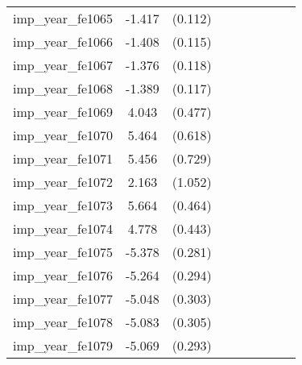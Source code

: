 {\begin{tabular}{l*{4}{cc}}
imp\_year\_fe1065&   -1.417\sym{***}&  (0.112)&                  &         &                  &         &                  &         \\
imp\_year\_fe1066&   -1.408\sym{***}&  (0.115)&                  &         &                  &         &                  &         \\
imp\_year\_fe1067&   -1.376\sym{***}&  (0.118)&                  &         &                  &         &                  &         \\
imp\_year\_fe1068&   -1.389\sym{***}&  (0.117)&                  &         &                  &         &                  &         \\
imp\_year\_fe1069&    4.043\sym{***}&  (0.477)&                  &         &                  &         &                  &         \\
imp\_year\_fe1070&    5.464\sym{***}&  (0.618)&                  &         &                  &         &                  &         \\
imp\_year\_fe1071&    5.456\sym{***}&  (0.729)&                  &         &                  &         &                  &         \\
imp\_year\_fe1072&    2.163\sym{*}  &  (1.052)&                  &         &                  &         &                  &         \\
imp\_year\_fe1073&    5.664\sym{***}&  (0.464)&                  &         &                  &         &                  &         \\
imp\_year\_fe1074&    4.778\sym{***}&  (0.443)&                  &         &                  &         &                  &         \\
imp\_year\_fe1075&   -5.378\sym{***}&  (0.281)&                  &         &                  &         &                  &         \\
imp\_year\_fe1076&   -5.264\sym{***}&  (0.294)&                  &         &                  &         &                  &         \\
imp\_year\_fe1077&   -5.048\sym{***}&  (0.303)&                  &         &                  &         &                  &         \\
imp\_year\_fe1078&   -5.083\sym{***}&  (0.305)&                  &         &                  &         &                  &         \\
imp\_year\_fe1079&   -5.069\sym{***}&  (0.293)&                  &         &                  &         &                  &         \\

\end{tabular}}
